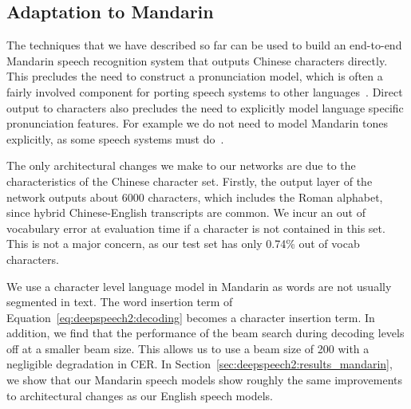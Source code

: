 \subsection{Adaptation to Mandarin}
\label{sec:deepspeech2:chinesemodel}

The techniques that we have described so far can be used to build an end-to-end
Mandarin speech recognition system that outputs Chinese characters directly.
This precludes the need to construct a pronunciation model, which is often a
fairly involved component for porting speech systems to other
languages~\cite{shan2010}. Direct output to characters also precludes the need
to explicitly model language specific pronunciation features. For example we do
not need to model Mandarin tones explicitly, as some speech systems must
do~\cite{shan2010, niu2013}.

The only architectural changes we make to our networks are due to the
characteristics of the Chinese character set. Firstly, the output layer of the
network outputs about 6000 characters, which includes the Roman alphabet, since
hybrid Chinese-English transcripts are common. We incur an out of vocabulary
error at evaluation time if a character is not contained in this set. This is
not a major concern, as our test set has only 0.74\% out of vocab characters.

We use a character level language model in Mandarin as words are not usually
segmented in text. The word insertion term of
Equation~\ref{eq:deepspeech2:decoding} becomes a character insertion term. In
addition, we find that the performance of the beam search during decoding
levels off at a smaller beam size. This allows us to use a beam size of 200
with a negligible degradation in CER. In
Section~\ref{sec:deepspeech2:results_mandarin}, we show that our Mandarin
speech models show roughly the same improvements to architectural changes as
our English speech models.
